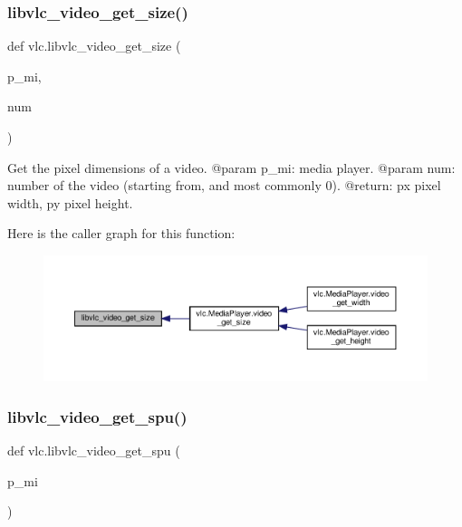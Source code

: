 \subsubsection{\texorpdfstring{libvlc\+\_\+video\+\_\+get\+\_\+size()}{libvlc\_video\_get\_size()}}
{\footnotesize\ttfamily def vlc.\+libvlc\+\_\+video\+\_\+get\+\_\+size (\begin{DoxyParamCaption}\item[{}]{p\+\_\+mi,  }\item[{}]{num }\end{DoxyParamCaption})}

\begin{DoxyVerb}Get the pixel dimensions of a video.
@param p_mi: media player.
@param num: number of the video (starting from, and most commonly 0).
@return: px pixel width, py pixel height.
\end{DoxyVerb}
 Here is the caller graph for this function\+:
\nopagebreak
\begin{figure}[H]
\begin{center}
\leavevmode
\includegraphics[width=350pt]{namespacevlc_a58dd475be13d1393cc878b2dd94df81a_icgraph}
\end{center}
\end{figure}
\mbox{\label{namespacevlc_ae6db3de1105a1c4365693745b2517c7d}} 
\subsubsection{\texorpdfstring{libvlc\+\_\+video\+\_\+get\+\_\+spu()}{libvlc\_video\_get\_spu()}}
{\footnotesize\ttfamily def vlc.\+libvlc\+\_\+video\+\_\+get\+\_\+spu (\begin{DoxyParamCaption}\item[{}]{p\+\_\+mi }\end{DoxyParamCaption})}

